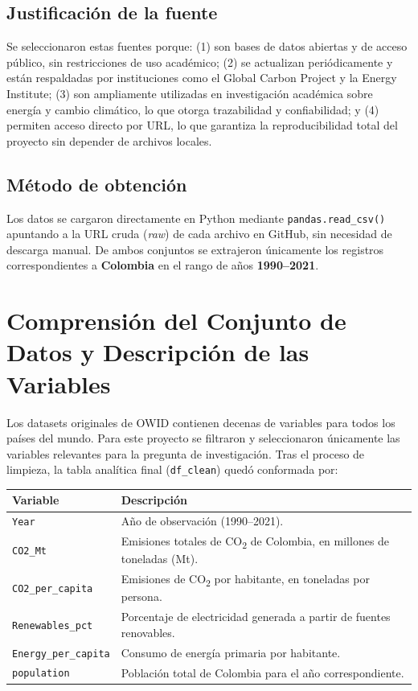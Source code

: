 \documentclass[11pt]{article}
\begin{document}
\subsection*{Justificación de la fuente}
Se seleccionaron estas fuentes porque: (1) son bases de datos abiertas y de acceso público, sin restricciones de uso académico; (2) se actualizan periódicamente y están respaldadas por instituciones como el Global Carbon Project y la Energy Institute; (3) son ampliamente utilizadas en investigación académica sobre energía y cambio climático, lo que otorga trazabilidad y confiabilidad; y (4) permiten acceso directo por URL, lo que garantiza la reproducibilidad total del proyecto sin depender de archivos locales.

\subsection*{Método de obtención}
Los datos se cargaron directamente en Python mediante \texttt{pandas.read\_csv()} apuntando a la URL cruda (\textit{raw}) de cada archivo en GitHub, sin necesidad de descarga manual. De ambos conjuntos se extrajeron únicamente los registros correspondientes a \textbf{Colombia} en el rango de años \textbf{1990--2021}.

\section{Comprensión del Conjunto de Datos y Descripción de las Variables}

Los datasets originales de OWID contienen decenas de variables para todos los países del mundo. Para este proyecto se filtraron y seleccionaron únicamente las variables relevantes para la pregunta de investigación. Tras el proceso de limpieza, la tabla analítica final (\texttt{df\_clean}) quedó conformada por:

\begin{center}
\begin{tabular}{@{}p{3.3cm}p{9.5cm}@{}}
\toprule
\textbf{Variable} & \textbf{Descripción} \\
\midrule
\texttt{Year} & Año de observación (1990--2021). \\
\texttt{CO2\_Mt} & Emisiones totales de CO\textsubscript{2} de Colombia, en millones de toneladas (Mt). \\
\texttt{CO2\_per\_capita} & Emisiones de CO\textsubscript{2} por habitante, en toneladas por persona. \\
\texttt{Renewables\_pct} & Porcentaje de electricidad generada a partir de fuentes renovables. \\
\texttt{Energy\_per\_capita} & Consumo de energía primaria por habitante. \\
\texttt{population} & Población total de Colombia para el año correspondiente. \\
\bottomrule
\end{tabular}
\end{center}
\end{document}
